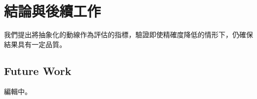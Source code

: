 \chapter{結論與後續工作}
\label{cha:conclusions}

我們提出將抽象化的動線作為評估的指標，驗證即使精確度降低的情形下，仍確保結果具有一定品質。

\section{Future Work} 
編輯中。
